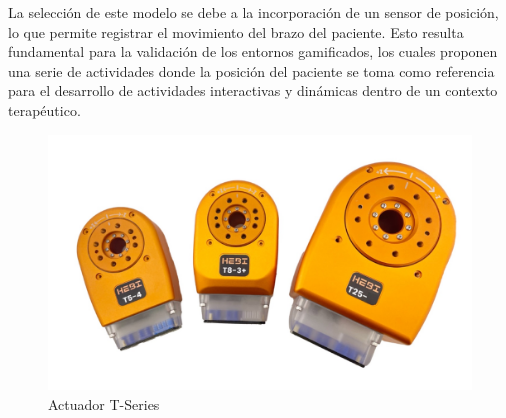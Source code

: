 La selección de este modelo se debe a la incorporación de un sensor de posición, lo que permite registrar el movimiento del brazo del paciente.
Esto resulta fundamental para la validación de los entornos gamificados, los cuales proponen una serie de actividades donde la posición del paciente se toma como referencia para el desarrollo de actividades interactivas y dinámicas dentro de un contexto terapéutico.

\begin{figure}[ht!]
	\centering
	\begin{minipage}{0.45\linewidth}
		\centering
		\includegraphics[width=\linewidth]{figs/actuador_T-Series.jpg}
	\end{minipage}
	\caption{Actuador T-Series}
	\label{fig:actuador}
\end{figure}
